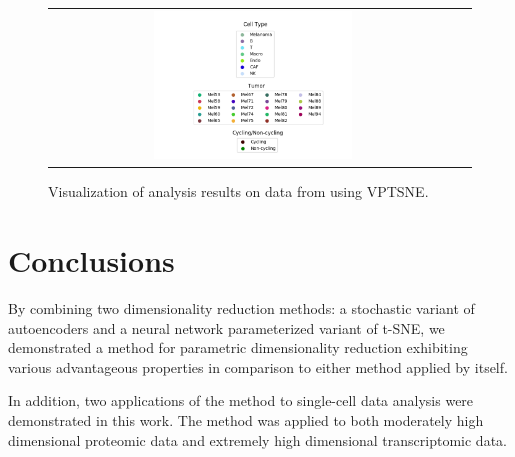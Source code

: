 \begin{figure}[!htb]
\begin{tabular}{cc}
    \includegraphics[width=0.5\textwidth]{images/tirosh_all_legends.png} \\
  \end{tabular}
  \caption{Visualization of analysis results on data from \cite{tirosh} using VPTSNE.}
  \label{fig:tirosh}
\end{figure}


\chapter{Conclusions}
\label{ch:conclusions}

By combining two dimensionality reduction methods: a stochastic variant of autoencoders and a neural network parameterized variant of t-SNE, we demonstrated a method for parametric dimensionality reduction exhibiting various advantageous properties in comparison to either method applied by itself. 

In addition, two applications of the method to single-cell data analysis were demonstrated in this work. The method was applied to both moderately high dimensional proteomic data and extremely high dimensional transcriptomic data. 



\ifnameyear
  
\else
  
\fi


\appendix
